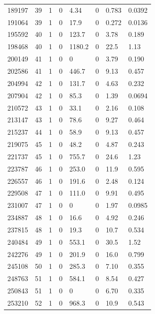 \documentclass[preview]{standalone}
\begin{document}
{{{{{{{{{{{{\begin{tabular}{L{1.2cm}C{1.2cm} C{0.3cm}C{0.5cm} C{1.4cm}C{1.4cm} C{1.4cm}C{1.4cm}}
  189197  &    39  & 1     &  0 &  4.34  & 0  & 0.783 &  0.0392   \\ 
  191064  &    39  & 1     &  0 &  17.9  & 0  & 0.272 &  0.0136   \\ 
  195592  &    40  & 1     &  0 &  123.7  & 0  & 3.78 &  0.189   \\ 
  198468  &    40  & 1     &  0 &  1180.2  & 0  & 22.5 &  1.13   \\ 
  200149  &    41  & 1     &  0 &  0  & 0  & 3.79 &  0.190   \\ 
  202586  &    41  & 1     &  0 &  446.7  & 0  & 9.13 &  0.457   \\ 
  204994  &    42  & 1     &  0 &  131.7  & 0  & 4.63 &  0.232   \\ 
  207904  &    42  & 1     &  0 &  85.3  & 0  & 1.39 &  0.0694   \\ 
  210572  &    43  & 1     &  0 &  33.1  & 0  & 2.16 &  0.108   \\ 
  213147  &    43  & 1     &  0 &  78.6  & 0  & 9.27 &  0.464   \\ 
  215237  &    44  & 1     &  0 &  58.9  & 0  & 9.13 &  0.457   \\ 
  219075  &    45  & 1     &  0 &  48.2  & 0  & 4.87 &  0.243   \\ 
  221737  &    45  & 1     &  0 &  755.7  & 0  & 24.6 &  1.23   \\ 
  223787  &    46  & 1     &  0 &  253.0  & 0  & 11.9 &  0.595   \\ 
  226557  &    46  & 1     &  0 &  191.6  & 0  & 2.48 &  0.124   \\ 
  229508  &    47  & 1     &  0 &  111.0  & 0  & 9.91 &  0.495   \\ 
  231007  &    47  & 1     &  0 &  0  & 0  & 1.97 &  0.0985   \\ 
  234887  &    48  & 1     &  0 &  16.6  & 0  & 4.92 &  0.246   \\ 
  237815  &    48  & 1     &  0 &  19.3  & 0  & 10.7 &  0.534   \\ 
  240484  &    49  & 1     &  0 &  553.1  & 0  & 30.5 &  1.52   \\ 
  242276  &    49  & 1     &  0 &  201.9  & 0  & 16.0 &  0.799   \\ 
  245108  &    50  & 1     &  0 &  285.3  & 0  & 7.10 &  0.355   \\ 
  248763  &    51  & 1     &  0 &  584.1  & 0  & 8.54 &  0.427   \\ 
  250843  &    51  & 1     &  0 &  0  & 0  & 6.70 &  0.335   \\ 
  253210  &    52  & 1     &  0 &  968.3  & 0  & 10.9 &  0.543   \\ 
\hline 
\end{tabular} 

}}}}}}}}}}}}
\end{document}
